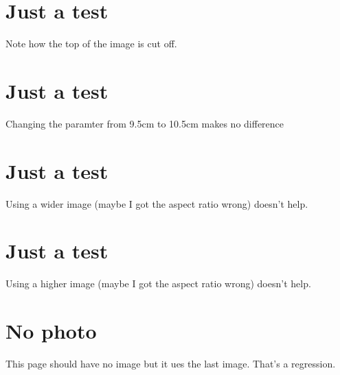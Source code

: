 \documentclass[
	a4paper,
	fontsize=10pt,
	twoside=false,
	numbers=noenddot,
]{kaobook}
\begin{document}
\mainmatter

\chapter{Just a test}

Note how the top of the image is cut off.

\chapter{Just a test}

Changing the paramter from 9.5cm to 10.5cm makes no difference

\chapter{Just a test}

Using a wider image (maybe I got the aspect ratio wrong) doesn't help.

\chapter{Just a test}

Using a higher image (maybe I got the aspect ratio wrong) doesn't help.

\chapter{No photo}

This page should have no image but it ues the last image.  That's a
regression.
\end{document}
